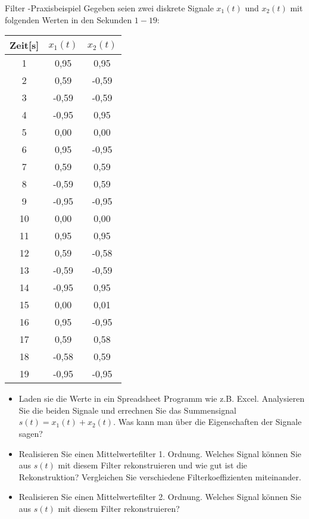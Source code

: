 
\begin{exercise}{Filter -Praxisbeispiel }
\label{ex-de-mt-filter-1}
Gegeben seien zwei diskrete Signale $x_1(t)$ und  $x_2(t)$ mit folgenden
Werten in den Sekunden $1-19$:\\
\begin{center}
  \begin{tabular}{ccc}
    Zeit[s]& $x_1(t)$    & $x_2(t)$   \\
    \hline
    1    & 0,95  & 0,95  \\
    2    & 0,59  & -0,59 \\
    3    & -0,59 & -0,59 \\
    4    & -0,95 & 0,95  \\
    5    & 0,00  & 0,00  \\
    6    & 0,95  & -0,95 \\
    7    & 0,59  & 0,59  \\
    8    & -0,59 & 0,59  \\
    9    & -0,95 & -0,95 \\
    10   & 0,00  & 0,00  \\
    11   & 0,95  & 0,95  \\
    12   & 0,59  & -0,58 \\
    13   & -0,59 & -0,59 \\
    14   & -0,95 & 0,95  \\
    15   & 0,00  & 0,01  \\
    16   & 0,95  & -0,95 \\
    17   & 0,59  & 0,58  \\
    18   & -0,58 & 0,59  \\
    19   & -0,95 & -0,95 \\
  \end{tabular}
\end{center}
\begin{itemize}
\item Laden sie die Werte in ein Spreadsheet Programm wie
  z.B. Excel. Analysieren Sie die beiden Signale und errechnen Sie das
  Summensignal $s(t)=x_1(t)+x_2(t)$. Was kann man \"uber die Eigenschaften der
  Signale sagen?
\item  Realisieren Sie einen Mittelwertefilter 1. Ordnung. Welches
  Signal k\"onnen Sie aus $s(t)$ mit diesem Filter rekonstruieren und
  wie gut ist die Rekonstruktion?
  Vergleichen Sie verschiedene Filterkoeffizienten miteinander.
\item  Realisieren Sie einen Mittelwertefilter 2. Ordnung. Welches
  Signal k\"onnen Sie aus $s(t)$ mit diesem Filter rekonstruieren?

\end{itemize}
\end{exercise}
